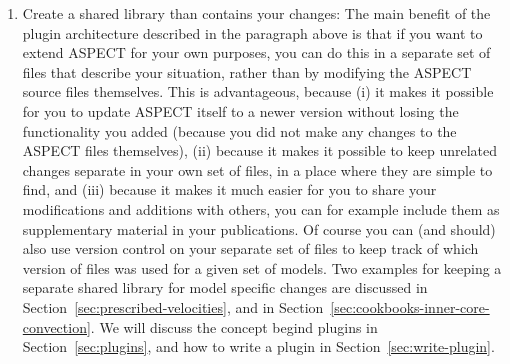 \documentclass{article}
\newcommand{\aspect}{\textsc{ASPECT}}
\begin{document}
\begin{enumerate}
\item Create a shared library than contains your changes: The main benefit of
the plugin architecture described in the paragraph above is that if you want to
extend \aspect{} for your own purposes, you can do this in a separate set of
files that describe your situation, rather than by modifying the \aspect{}
source files themselves. This is advantageous, because (i) it makes it possible
for you to update \aspect{} itself to a newer version without losing the
functionality you added (because you did not make any changes to the \aspect{}
files themselves), (ii) because it makes it possible to keep unrelated changes
separate in your own set of files, in a place where they are simple to find,
and (iii) because it makes it much easier for you to share your modifications
and additions with others, you can for example include them as supplementary
material in your publications. Of course you can (and should) also use version
control on your separate set of files to keep track of which version of files
was used for a given set of models. Two examples for keeping a separate shared
library for model specific changes are discussed in
Section~\ref{sec:prescribed-velocities}, and in
Section~\ref{sec:cookbooks-inner-core-convection}. We will discuss the concept
begind plugins in Section~\ref{sec:plugins}, and how to write a plugin in
Section~\ref{sec:write-plugin}.
\end{enumerate}
\end{document}
